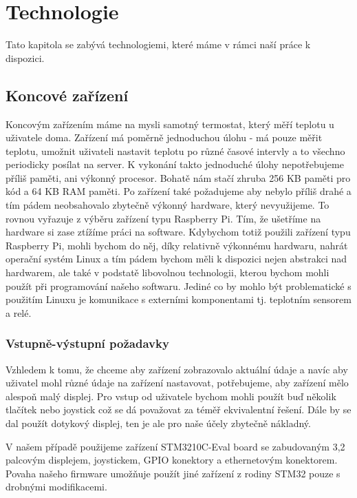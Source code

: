 \chapter{Technologie}
Tato kapitola se zabývá technologiemi, které máme v rámci naší práce k dispozici.

\section{Koncové zařízení}
Koncovým zařízením máme na mysli samotný termostat, který měří teplotu u uživatele doma.
Zařízení má poměrně jednoduchou úlohu - má pouze měřit teplotu, umožnit uživateli nastavit teplotu po
různé časové intervly a to všechno periodicky posílat na server.
K vykonání takto jednoduché úlohy nepotřebujeme příliš paměti, ani výkonný procesor.
Bohatě nám stačí zhruba 256 KB paměti pro kód a 64 KB RAM paměti.
Po zařízení také požadujeme aby nebylo příliš drahé a tím pádem neobsahovalo zbytečně výkonný
hardware, který nevyužijeme.
To rovnou vyřazuje z výběru zařízení typu Raspberry Pi.
Tím, že ušetříme na hardware si zase ztížíme práci na software.
Kdybychom totiž použili zařízení typu Raspberry Pi, mohli bychom do něj, díky relativně
výkonnému hardwaru, nahrát operační systém Linux a tím pádem bychom měli k dispozici nejen
abstrakci nad hardwarem, ale také v podstatě libovolnou technologii, kterou bychom mohli použít
při programování našeho softwaru.
Jediné co by mohlo být problematické s použitím Linuxu je komunikace s externími komponentami tj.
teplotním sensorem a relé.


\subsection{Vstupně-výstupní požadavky}
Vzhledem k tomu, že chceme aby zařízení zobrazovalo aktuální údaje a navíc aby uživatel mohl
různé údaje na zařízení nastavovat, potřebujeme, aby zařízení mělo alespoň malý displej.
Pro vstup od uživatele bychom mohli použít buď několik tlačítek nebo joystick což se dá považovat
za téměř ekvivalentní řešení.
Dále by se dal použít dotykový displej, ten je ale pro naše účely zbytečně nákladný.

V našem případě použijeme zařízení STM3210C-Eval board \cite{STM3210C-Eval} se zabudovaným 3,2 palcovým displejem,
joystickem, GPIO konektory a ethernetovým konektorem.
Povaha našeho firmware umožňuje použít jiné zařízení z rodiny STM32 pouze s drobnými modifikacemi.

